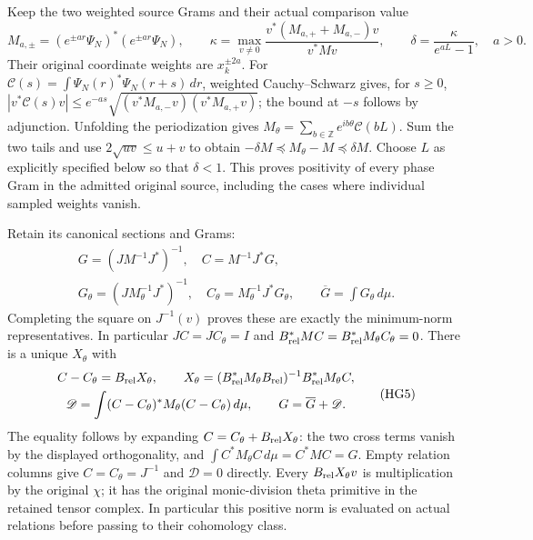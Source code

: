 \documentclass{article}
\begin{document}
Keep the two weighted source Grams and their actual comparison value
\[
 M_{a,\pm}=(e^{\pm ar}\Psi_N)^*(e^{\pm ar}\Psi_N),\qquad
 \kappa=\max_{v\ne0}\frac{v^*(M_{a,+}+M_{a,-})v}{v^*Mv},\qquad
 \delta=\frac{\kappa}{e^{aL}-1},\quad a>0.
 \tag{HG3}
\]
Their original coordinate weights are $x_k^{\pm2a}$. For
$\mathcal C(s)=\int\Psi_N(r)^*\Psi_N(r+s)\,dr$, weighted
Cauchy--Schwarz gives, for $s\ge0$,
$|v^*\mathcal C(s)v|\le e^{-as}
\sqrt{(v^*M_{a,-}v)(v^*M_{a,+}v)}$; the bound at $-s$ follows by
adjunction. Unfolding the periodization gives
$M_\theta=\sum_{b\in\mathbb Z}e^{ib\theta}\mathcal C(bL)$.
Sum the two tails and use $2\sqrt{uv}\le u+v$ to obtain
$-\delta M\preceq M_\theta-M\preceq\delta M$.
Choose $L$ as explicitly specified below so that $\delta<1$.
This proves positivity of every phase Gram in the admitted original
source, including the cases where individual sampled weights vanish.

Retain its canonical sections and Grams:
\[
\begin{gathered}
 G=(JM^{-1}J^*)^{-1},\quad C=M^{-1}J^*G,\\
 G_\theta=(JM_\theta^{-1}J^*)^{-1},\quad
 C_\theta=M_\theta^{-1}J^*G_\theta,\qquad
 \overline G=\int G_\theta\,d\mu .
\end{gathered}\tag{HG4}
\]
Completing the square on $J^{-1}(v)$ proves these are exactly the
minimum-norm representatives. In particular $JC=JC_\theta=I$ and
$B_{\rm rel}^*MC=B_{\rm rel}^*M_\theta C_\theta=0$.
There is a unique $X_\theta$ with
\[
\begin{gathered}
 C-C_\theta=B_{\rm rel}X_\theta,\qquad
 X_\theta=(B_{\rm rel}^*M_\theta B_{\rm rel})^{-1}
                       B_{\rm rel}^*M_\theta C,\\
 \mathscr D=\int (C-C_\theta)^*M_\theta(C-C_\theta)\,d\mu,
 \qquad G=\overline G+\mathscr D .
\end{gathered}\tag{HG5}
\]
The equality follows by expanding $C=C_\theta+B_{\rm rel}X_\theta$:
the two cross terms vanish by the displayed orthogonality, and
$\int C^*M_\theta C\,d\mu=C^*MC=G$. Empty relation columns give
$C=C_\theta=J^{-1}$ and $\mathscr D=0$ directly.
Every $B_{\rm rel}X_\theta v$ is multiplication by the original $\chi$;
it has the original monic-division theta primitive in the retained
tensor complex. In particular this positive norm is evaluated on actual
relations before passing to their cohomology class.
\end{document}

